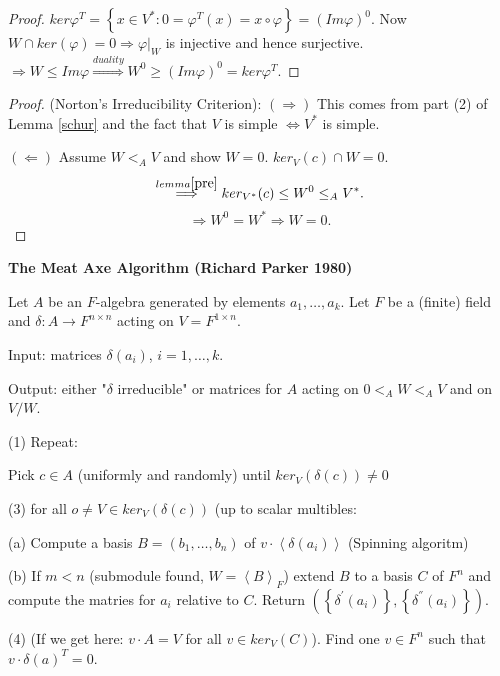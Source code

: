 \documentclass[12pt]{amsart}
\theoremstyle{definition}
\begin{document}
\begin{proof}
$ker \varphi^{T} = \left\{ x \in V^{\ast} : 0 = \varphi^{T} (x) = x \circ \varphi \right\} = (Im \varphi)^{0}$. Now $W \cap ker( \varphi ) = 0 \Rightarrow \varphi |_{W} $ is injective and hence surjective. $\Rightarrow W \leq Im \varphi \stackrel{duality}{\Longrightarrow} W^{0} \geq (Im \varphi)^{0} = ker \varphi^{T}$.
\end{proof}

\begin{proof} (Norton's Irreducibility Criterion):
$\left( \Rightarrow \right)$ This comes from part (2) of Lemma \ref{schur} and the fact that $V$ is simple $\Leftrightarrow V^{\ast}$ is simple.

$\left( \Leftarrow \right)$ Assume $W <_{A} V$ and show $W = 0$.
$ker_{V} (c) \cap W = 0$. $$\stackrel{lemma \ref{pre}}{\Longrightarrow} ker_{V^{\ast}} (c) \leq W^{0} \leq_{A} V^{\ast}.$$
$$\Rightarrow W^{0} = W^{\ast} \Rightarrow W = 0.$$
\end{proof}

\begin{center}
\textbf{The Meat Axe Algorithm (Richard Parker 1980)}
\end{center}
Let $A$ be an $F$-algebra generated by elements $a_{1}, \ldots, a_{k}$. Let $F$ be a (finite) field and $\delta: A \rightarrow F^{n \times n}$ acting on $V = F^{1 \times n}$.

Input: matrices $\delta (a_{i})$, $i = 1, \ldots, k$.

Output: either "$\delta$ irreducible" or matrices for $A$ acting on $0 <_{A} W <_{A} V$ and on $V/W$.

(1) Repeat:

Pick $c \in A$ (uniformly and randomly) until $ker_{V} (\delta (c)) \neq 0$

(3) for all $o \neq V \in ker_{V} (\delta(c))$ (up to scalar multibles:

(a) Compute a  basis $B = (b_{1}, \ldots, b_{n} )$ of $v \cdot \left\langle \delta (a_{i}) \right\rangle$ (Spinning algoritm)

(b) If $m < n$ (submodule found, $W = \left\langle B \right\rangle_{F}$) extend $B$ to a basis $C$ of $F^{n}$ and compute the matries for $a_{i}$  relative to $C$. Return $\left( \left\{ \delta^{'} (a_{i}) \right\}, \left\{ \delta^{''}(a_{i}) \right\} \right)$.

(4) (If we get here: $v\cdot A =V$ for all $v \in ker_{V} (C)$). Find one $v \in F^{n}$ such that $v \cdot \delta (a)^{T} = 0$.
\end{document}
